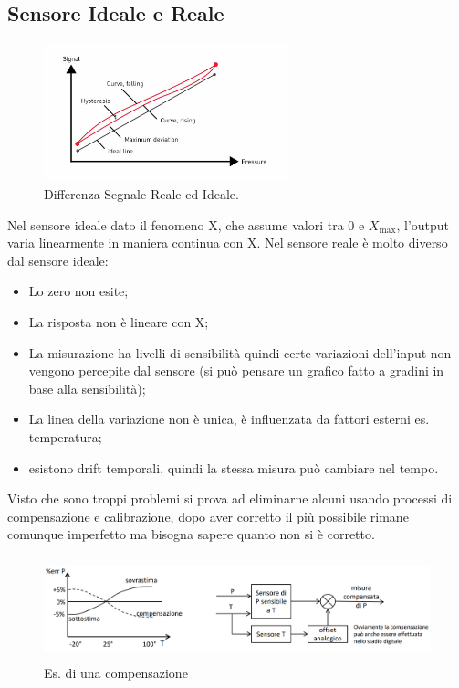 \documentclass[11pt, twocolumn]{article}
\newenvironment{myitemize}
{ \begin{itemize}[topsep=0ex]
		\setlength{\itemsep}{0pt}
		\setlength{\parskip}{0pt}
		\setlength{\parsep}{0pt}     }
	{ \end{itemize}                  }
\begin{document}
\subsection{Sensore Ideale e Reale}
\begin{figure}[!h]
  \centering
  \includegraphics[width=\linewidth,height=4cm]{imgs/ideal-real.jpg}
  \caption{Differenza Segnale Reale ed Ideale.}
  \label{fig:ideal_real}
\end{figure}
Nel sensore ideale dato il fenomeno X, che assume valori tra $0$ e $X_{\max}$, l'output varia linearmente in maniera continua con X.
Nel sensore reale è molto diverso dal sensore ideale:
\begin{myitemize}
  \item Lo zero non esite;
  \item La risposta non è lineare con X;
  \item La misurazione ha livelli di sensibilità quindi certe variazioni dell'input non vengono percepite dal sensore (si può pensare un grafico fatto a gradini in base alla sensibilità);
  \item La linea della variazione non è unica, è influenzata da fattori esterni es. temperatura;
  \item esistono drift temporali, quindi la stessa misura può cambiare nel tempo.
\end{myitemize}
Visto che sono troppi problemi si prova ad eliminarne alcuni usando processi di compensazione e calibrazione, dopo aver corretto il più possibile rimane comunque imperfetto ma bisogna sapere quanto non si è corretto.\\
\begin{figure}[!h]
  \centering
  \includegraphics[width=\linewidth,height=3cm]{imgs/compensazione.png}
  \caption{Es. di una compensazione}
  \label{fig:compensazione}
\end{figure}\\
\end{document}

